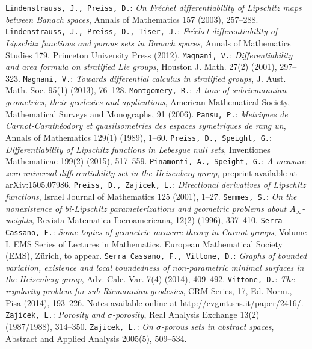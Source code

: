 \documentclass[reqno, 11pt]{amsart}
\theoremstyle{definition}
\theoremstyle{remark}
\numberwithin{theorem}{section}
\numberwithin{equation}{section}
\begin{document}
\begin{thebibliography}{99}
 \texttt{Lindenstrauss, J., Preiss, D.}: \emph{On Fr\'{e}chet differentiability of Lipschitz maps between Banach spaces}, Annals of Mathematics 157 (2003), 257--288.
 \texttt{Lindenstrauss, J., Preiss, D., Tiser, J.}: \emph{Fr\'{e}chet differentiability of Lipschitz functions and porous sets in Banach spaces}, Annals of Mathematics Studies 179, Princeton University Press (2012).
 \texttt{Magnani, V.}: \emph{Differentiability and area formula on stratified Lie groups}, Houston J. Math. 27(2) (2001), 297--323.
 \texttt{Magnani, V.}: \emph{Towards differential calculus in stratified groups}, J. Aust. Math. Soc. 95(1) (2013), 76--128.
 \texttt{Montgomery, R.}: \emph{A tour of subriemannian geometries, their geodesics and applications}, American Mathematical Society, Mathematical Surveys and Monographs, 91 (2006).
 \texttt{Pansu, P.}: \emph{Metriques de Carnot-Carath\'{e}odory et quasiisometries des espaces symetriques de rang un}, Annals of Mathematics 129(1) (1989), 1--60.
 \texttt{Preiss, D., Speight, G.}: \emph{Differentiability of Lipschitz functions in Lebesgue null sets}, Inventiones Mathematicae 199(2) (2015), 517--559.
 \texttt{Pinamonti, A., Speight, G.}: \emph{A measure zero universal differentiability set in the Heisenberg group}, preprint available at arXiv:1505.07986.
 \texttt{Preiss, D., Zajicek, L.}: \emph{Directional derivatives of Lipschitz functions}, Israel Journal of Mathematics 125 (2001), 1--27.
 \texttt{Semmes, S.}: \emph{On the nonexistence of bi-Lipschitz parameterizations and geometric problems about $A_{\infty}$-weights}, Revista Matematica Iberoamericana, 12(2) (1996), 337--410.
 \texttt{Serra Cassano, F.}: \emph{Some topics of geometric measure theory in Carnot groups}, Volume I, EMS Series of Lectures in Mathematics. European Mathematical Society (EMS), Z\"urich, to appear.
 \texttt{Serra Cassano, F., Vittone, D.}: \emph{Graphs of bounded variation, existence and local boundedness of non-parametric minimal surfaces in the Heisenberg group},  Adv. Calc. Var. 7(4) (2014), 409--492.
 \texttt{Vittone, D.}: \emph{The regularity problem for sub-Riemannian geodesics}, CRM Series, 17, Ed. Norm., Pisa (2014), 193--226. Notes available online at http://cvgmt.sns.it/paper/2416/.
 \texttt{Zajicek, L.}: \emph{Porosity and $\sigma$-porosity}, Real Analysis Exchange 13(2) (1987/1988), 314--350.
 \texttt{Zajicek, L.}: \emph{On $\sigma$-porous sets in abstract spaces}, Abstract and Applied Analysis 2005(5), 509--534.
\end{thebibliography}
\end{document}
